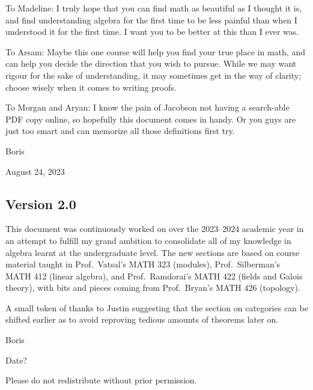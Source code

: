 \medskip

To Madeline:
I truly hope that you can find math as beautiful as I thought it is,
and find understanding algebra for the first time
to be less painful than when I understood it for the first time.
I want you to be better at this than I ever was.

To Arsam:
Maybe this one course will help you find your true place in math,
and can help you decide the direction that you wish to pursue.
While we may want rigour for the sake of understanding,
it may sometimes get in the way of clarity;
choose wisely when it comes to writing proofs.

To Morgan and Aryan:
I know the pain of
Jacobson not having a search-able PDF copy online,
so hopefully this document comes in handy.
Or you guys are just too smart
and can memorize all those definitions first try.

\medskip

Boris

August 24, 2023

\subsection*{Version 2.0}

This document was continuously worked on
over the 2023--2024 academic year
in an attempt to fulfill my grand ambition
to consolidate all of my knowledge in algebra
learnt at the undergraduate level.
The new sections are based on course material taught in
Prof.\ Vatsal's MATH 323 (modules),
Prof.\ Silberman's MATH 412 (linear algebra),
and Prof.\ Ramdorai's MATH 422 (fields and Galois theory),
with bits and pieces coming from Prof.\ Bryan's MATH 426 (topology).

A small token of thanks to Justin
suggesting that the section on categories can be shifted earlier
as to avoid reproving tedious amounts of theorems later on.

\medskip

Boris

Date?

\vspace{5mm}

Please do not redistribute without prior permission.
